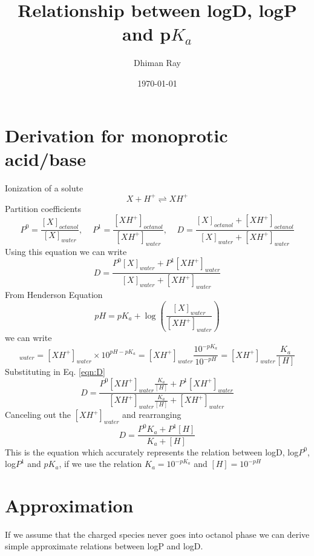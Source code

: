\documentclass{article}
\title{Relationship between logD, logP and p$K_a$}
\author{Dhiman Ray}
\date{\today}
\begin{document}
\maketitle

\section{Derivation for monoprotic acid/base}
Ionization of a solute 
\begin{equation}
    X + H^+ \rightleftharpoons XH^+
\end{equation}
Partition coefficients
\begin{equation}
    P^0 = \frac{[X]_{octanol}}{[X]_{water}}, \;\;\;\; 
    P^1 = \frac{[XH^+]_{octanol}}{[XH^+]_{water}}, \;\;\;\;
    D = \frac{[X]_{octanol} + [XH^+]_{octanol}}{[X]_{water} + [XH^+]_{water}}
\end{equation}
Using this equation we can write
\begin{equation}
    D = \frac{P^0[X]_{water} + P^1[XH^+]_{water}}{[X]_{water} + [XH^+]_{water}}
    \label{eqn:D}
\end{equation}
From Henderson Equation
\begin{equation}
    pH = pK_a + \log \left(\frac{[X]_{water}}{[XH^+]_{water}}\right)
\end{equation}
we can write 
\begin{equation}
    [X]_{water} = [XH^+]_{water} \times 10^{pH - pK_a} = [XH^+]_{water} \frac{10^{- pK_a}}{10^{-pH}} = [XH^+]_{water} \frac{K_a}{[H]}
\end{equation}
Substituting in Eq. \ref{eqn:D}
\begin{equation}
    D = \frac{P^0 [XH^+]_{water} \frac{K_a}{[H]} + P^1[XH^+]_{water}}{[XH^+]_{water} \frac{K_a}{[H]} + [XH^+]_{water}}
\end{equation}
Canceling out the $[XH^+]_{water}$ and rearranging
\begin{equation}
    D = \frac{P^0 K_a + P^1 [H]}{K_a + [H]}
    \label{eqn:Dexact}
\end{equation}
This is the equation which accurately represents the relation between logD, log$P^0$, log$P^1$ and $pK_a$, if we use the relation $K_a = 10^{- pK_a}$ and $[H] = 10^{- pH}$

\section{Approximation}
If we assume that the charged species never goes into octanol phase we can derive simple approximate relations between logP and logD. 
\end{document}
